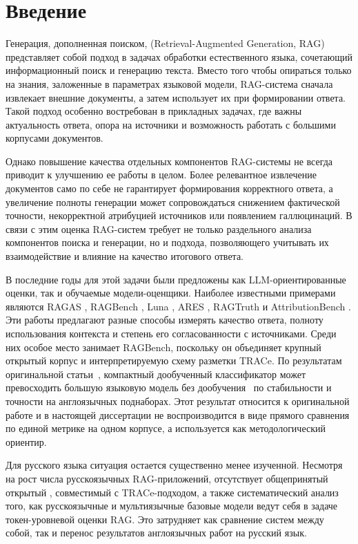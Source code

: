 \section{Введение}

Генерация, дополненная поиском, (Retrieval-Augmented Generation, \gls{RAG}) \cite{gao2023retrieval}
представляет собой подход в задачах обработки естественного языка, сочетающий
информационный поиск и генерацию текста. Вместо того чтобы опираться только на знания,
заложенные в параметрах языковой модели, RAG-система сначала извлекает внешние документы,
а затем использует их при формировании ответа. Такой подход особенно востребован в
прикладных задачах, где важны актуальность ответа, опора на источники и возможность
работать с большими корпусами документов.

Однако повышение качества отдельных компонентов RAG-системы не всегда приводит к улучшению
ее работы в целом. Более релевантное извлечение документов само по себе не гарантирует
формирования корректного ответа, а увеличение полноты генерации может сопровождаться
снижением фактической точности, некорректной атрибуцией источников или появлением
галлюцинаций. В связи с этим оценка RAG-систем требует не только раздельного анализа
компонентов поиска и генерации, но и подхода, позволяющего учитывать их взаимодействие
и влияние на качество итогового ответа.


В последние годы для этой задачи были предложены как LLM-ориентированные 
оценки, так и обучаемые модели-оценщики. Наиболее известными примерами являются
RAGAS \cite{es2024ragas}, RAGBench \cite{friel2024ragbench}, Luna \cite{belyi2024luna},
ARES \cite{saad2023ares}, RAGTruth \cite{niu2023ragtruth} и
AttributionBench \cite{li2024attributionbench}. Эти работы предлагают разные способы
измерять качество ответа, полноту использования контекста и степень его согласованности
с источниками. Среди них особое место занимает RAGBench, поскольку он объединяет крупный
открытый корпус и интерпретируемую схему разметки \gls{TRACe}. По результатам
оригинальной статьи~\cite{friel2024ragbench}, компактный дообученный классификатор
может превосходить большую языковую модель без дообучения~\cite{brown2020language}
по стабильности и точности на англоязычных поднаборах. Этот результат относится
к оригинальной работе и в настоящей диссертации не воспроизводится в виде прямого
сравнения по единой метрике на одном корпусе, а используется как методологический
ориентир.

Для русского языка ситуация остается существенно менее изученной. Несмотря на рост числа
русскоязычных RAG-приложений, отсутствует общепринятый открытый , совместимый с
TRACe-подходом, а также систематический анализ того, как русскоязычные и мультиязычные
базовые модели ведут себя в задаче токен-уровневой оценки RAG. Это затрудняет как
сравнение систем между собой, так и перенос результатов англоязычных работ на русский
язык.

